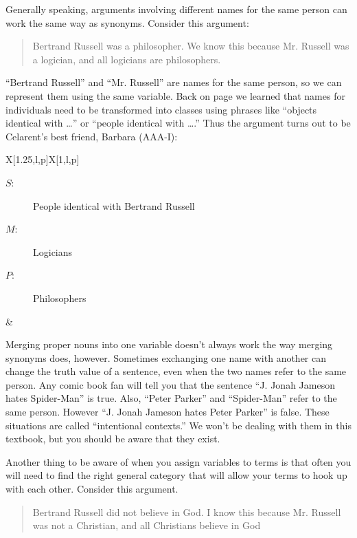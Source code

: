 Generally speaking, arguments involving different names for the same person can work the same way as synonyms. Consider this argument:

\begin{quotation}
\noindent Bertrand Russell was a philosopher. We know this because Mr. Russell was a logician, and all logicians are philosophers.
\end{quotation}

``Bertrand Russell'' and ``Mr. Russell'' are names for the same person, so we can represent them using the same variable. Back on page \pageref{subsec:singular_propositions} we learned that names for individuals need to be transformed into classes using phrases like ``objects identical with \ldots'' or ``people identical with \ldots.''  Thus the argument turns out to be Celarent's best friend, Barbara (AAA-I):

\begin{tabu}{{X[1.25,l,p]X[1,l,p]}}
\begin{description}
\item[$S$:] People identical with Bertrand Russell
\item[$M$:] Logicians
\item[$P$:] Philosophers
\end{description}
&
\begin{kormanize}
\end{kormanize}
\end{tabu}

Merging proper nouns into one variable doesn't always work the way merging synonyms does, however. Sometimes exchanging one name with another can change the truth value of a sentence, even when the two names refer to the same person. Any comic book fan will tell you that the sentence ``J. Jonah Jameson hates Spider-Man'' is true. Also, ``Peter Parker'' and ``Spider-Man'' refer to the same person. However ``J. Jonah Jameson hates Peter Parker'' is false. These situations are called ``intentional contexts.'' We won't be dealing with them in this textbook, but you should be aware that they exist.

Another thing to be aware of when you assign variables to terms is that often you will need to find the right general category that will allow your terms to hook up with each other. \label{finding_general_terms} Consider this argument.

\begin{quotation}
Bertrand Russell did not believe in God. I know this because Mr. Russell was not a Christian, and all Christians believe in God
\end{quotation}

